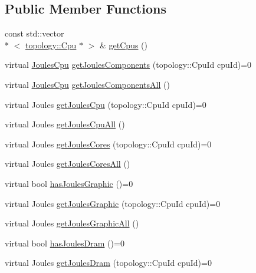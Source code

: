 \subsection*{Public Member Functions}
\begin{DoxyCompactItemize}
\item 
const std\-::vector\\*
$<$ \hyperlink{classmammut_1_1topology_1_1Cpu}{topology\-::\-Cpu} $\ast$ $>$ \& \hyperlink{classmammut_1_1energy_1_1CounterCpus_a25dbf6940e615a3662cbe10292ad7eaa}{get\-Cpus} ()
\item 
virtual \hyperlink{classmammut_1_1energy_1_1JoulesCpu}{Joules\-Cpu} \hyperlink{classmammut_1_1energy_1_1CounterCpus_a4324fc4985dc89228450436db46551b7}{get\-Joules\-Components} (topology\-::\-Cpu\-Id cpu\-Id)=0
\item 
virtual \hyperlink{classmammut_1_1energy_1_1JoulesCpu}{Joules\-Cpu} \hyperlink{classmammut_1_1energy_1_1CounterCpus_ad4c4327b501f7dcdbf2a8cf644bb3544}{get\-Joules\-Components\-All} ()
\item 
virtual Joules \hyperlink{classmammut_1_1energy_1_1CounterCpus_a80c1f90abccce3f3ab621f08f7141f78}{get\-Joules\-Cpu} (topology\-::\-Cpu\-Id cpu\-Id)=0
\item 
virtual Joules \hyperlink{classmammut_1_1energy_1_1CounterCpus_a4e4ab2e96f0f9c48d0314dcbb5f4b0a2}{get\-Joules\-Cpu\-All} ()
\item 
virtual Joules \hyperlink{classmammut_1_1energy_1_1CounterCpus_a2c041bbe181f593a50490a53a2729989}{get\-Joules\-Cores} (topology\-::\-Cpu\-Id cpu\-Id)=0
\item 
virtual Joules \hyperlink{classmammut_1_1energy_1_1CounterCpus_a05c7df2da523e083fa1417c0df6dfe57}{get\-Joules\-Cores\-All} ()
\item 
virtual bool \hyperlink{classmammut_1_1energy_1_1CounterCpus_a94de30741049ba2131bcac532b8e7c8e}{has\-Joules\-Graphic} ()=0
\item 
virtual Joules \hyperlink{classmammut_1_1energy_1_1CounterCpus_a436f91199f40af85ce1b561781f24459}{get\-Joules\-Graphic} (topology\-::\-Cpu\-Id cpu\-Id)=0
\item 
virtual Joules \hyperlink{classmammut_1_1energy_1_1CounterCpus_a2fc920fa0ccf3c297a6aa4cc5d7d947f}{get\-Joules\-Graphic\-All} ()
\item 
virtual bool \hyperlink{classmammut_1_1energy_1_1CounterCpus_a3d8c64aac5808275abdb2b01a31cbc11}{has\-Joules\-Dram} ()=0
\item 
virtual Joules \hyperlink{classmammut_1_1energy_1_1CounterCpus_a832e466d0a1f40f347d9a0211059a762}{get\-Joules\-Dram} (topology\-::\-Cpu\-Id cpu\-Id)=0

\end{DoxyCompactItemize}

